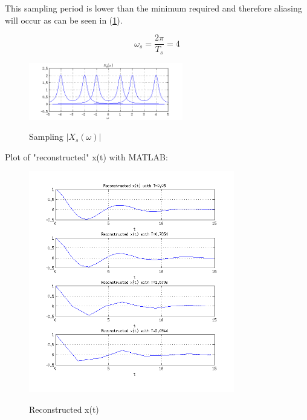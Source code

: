 This sampling period is lower than the minimum required and therefore 
aliasing will occur as can be seen in (\ref{fig:c3p2c}).

\begin{equation*}
\omega_s = \frac{2 \pi}{T_s} = 4
\end{equation*} 

\begin{figure}[H]
\caption{Sampling $|X_s(\omega)|$}
\centering
\includegraphics[width=0.6\textwidth]{figs/c3p2c.png}
\label{fig:c3p2c}
\end{figure}

Plot of "reconstructed" x(t) with MATLAB:


\begin{figure}[H]
\caption{Reconstructed x(t)}
\centering
\includegraphics[width=0.8\textwidth]{figs/c3p2recons.png}
\label{fig:c3p2recons}
\end{figure} 

